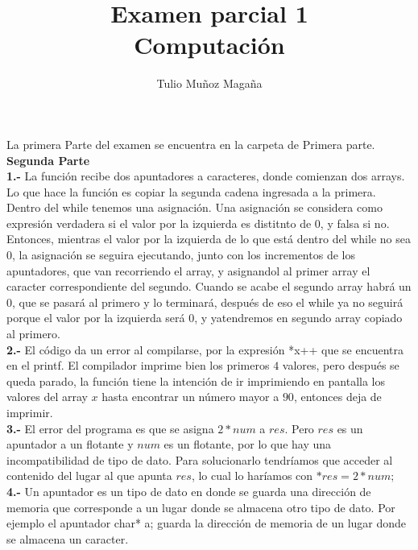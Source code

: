 \documentclass{article}
\begin{document}
\title{Examen parcial 1\\
	\large Computación}
\author{Tulio Muñoz Magaña}
\maketitle

La primera Parte del examen se encuentra en la carpeta de Primera parte.\\

\textbf{Segunda Parte}\\

\textbf{1.-} La función recibe dos apuntadores a caracteres, donde comienzan dos arrays. Lo que hace la función es copiar la segunda cadena ingresada a la primera.\\
Dentro del while tenemos una asignación. Una asignación se considera como expresión verdadera si el valor por la izquierda es distitnto de $0$, y falsa si no. Entonces, mientras el valor por la izquierda de lo que está dentro del while no sea $0$, la asignación se seguira ejecutando, junto con los incrementos de los apuntadores, que van recorriendo el array, y asignandol al primer array el caracter correspondiente del segundo. Cuando se acabe el segundo array habrá un $0$, que se pasará al primero y lo terminará, después de eso el while ya no seguirá porque el valor por la izquierda será $0$, y yatendremos en segundo array copiado al primero.\\

\textbf{2.-} El código da un error al compilarse, por la expresión *x++ que se encuentra en el printf. El compilador imprime bien los primeros $4$ valores, pero después se queda parado, la función tiene la intención de ir imprimiendo en pantalla los valores del array $x$ hasta encontrar un número mayor a $90$, entonces deja de imprimir.\\

\textbf{3.-} El error del programa es que se asigna $2*num$ a $res$. Pero $res$ es un apuntador a un flotante y $num$ es un flotante, por lo que hay una incompatibilidad de tipo de dato. Para solucionarlo tendríamos que acceder al contenido del lugar al que apunta $res$, lo cual lo haríamos con $*res = 2*num;$\\

\textbf{4.-} Un apuntador es un tipo de dato en donde se guarda una dirección de memoria que corresponde a un lugar donde se almacena otro tipo de dato. Por ejemplo el apuntador char* a; guarda la dirección de memoria de un lugar donde se almacena un caracter.\\
\end{document}
